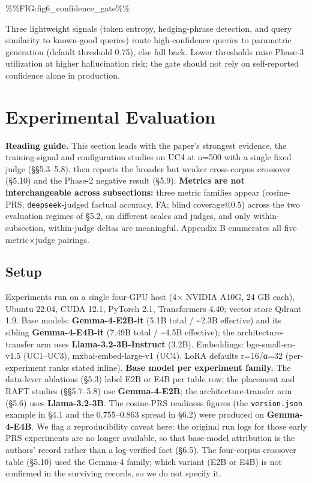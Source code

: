 \%\%FIG:fig6\_confidence\_gate\%\%

Three lightweight signals (token entropy, hedging-phrase detection, and query similarity to known-good queries) route high-confidence queries to parametric generation (default threshold 0.75), else fall back. Lower thresholds raise Phase-3 utilization at higher hallucination risk; the gate should not rely on self-reported confidence alone in production.

\hypertarget{experimental-evaluation}{%
\section{Experimental Evaluation}\label{experimental-evaluation}}

\textbf{Reading guide.} This section leads with the paper's strongest evidence, the training-signal and configuration studies on UC4 at n=500 with a single fixed judge (§§5.3--5.8), then reports the broader but weaker cross-corpus crossover (§5.10) and the Phase-2 negative result (§5.9). \textbf{Metrics are not interchangeable across subsections:} three metric families appear (cosine-PRS; \texttt{deepseek}-judged factual accuracy, FA; blind coverage@0.5) across the two evaluation regimes of §5.2, on different scales and judges, and only within-subsection, within-judge deltas are meaningful. Appendix B enumerates all five metric×judge pairings.

\hypertarget{setup}{%
\subsection{Setup}\label{setup}}

Experiments run on a single four-GPU host (4× NVIDIA A10G, 24 GB each), Ubuntu 22.04, CUDA 12.1, PyTorch 2.1, Transformers 4.40; vector store Qdrant 1.9. Base models: \textbf{Gemma-4-E2B-it} (5.1B total / \textasciitilde2.3B effective) and its sibling \textbf{Gemma-4-E4B-it} (7.49B total / \textasciitilde4.5B effective); the architecture-transfer arm uses \textbf{Llama-3.2-3B-Instruct} (3.2B). Embeddings: bge-small-en-v1.5 (UC1--UC3), mxbai-embed-large-v1 (UC4). LoRA defaults r=16/α=32 (per-experiment ranks stated inline). \textbf{Base model per experiment family.} The data-lever ablations (§5.3) label E2B or E4B per table row; the placement and RAFT studies (§§5.7--5.8) use \textbf{Gemma-4-E2B}; the architecture-transfer arm (§5.6) uses \textbf{Llama-3.2-3B}. The cosine-PRS readiness figures (the \texttt{version.json} example in §4.1 and the 0.755--0.863 spread in §6.2) were produced on \textbf{Gemma-4-E4B}. We flag a reproducibility caveat here: the original run logs for those early PRS experiments are no longer available, so that base-model attribution is the authors' record rather than a log-verified fact (§6.5). The four-corpus crossover table (§5.10) used the Gemma-4 family; which variant (E2B or E4B) is not confirmed in the surviving records, so we do not specify it.

